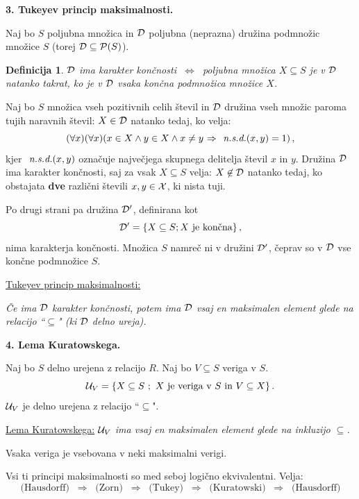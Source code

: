 \documentclass[11pt,paper=b5,DIV=13,headinclude,footinclude]{scrbook}
\newcounter{example}
\def\sledi {{~\Rightarrow~}}
\def\cee {{~\Leftrightarrow~}}
\newtheorem*{definicija}{Definicija}
\begin{document}
\bigskip
\bigskip
\textbf{3. Tukeyev princip maksimalnosti.}

Naj bo $S$ poljubna množica in ${\cal D}$ poljubna (neprazna) družina podmnožic množice $S$ (torej ${\cal D}\subseteq {\cal P}(S)$).

\begin{definicija}
${\cal D}$  ima {\em karakter končnosti} $\cee$ poljubna množica $X\subseteq S$ je v ${\cal D}$ natanko takrat, ko je v ${\cal D}$ vsaka {\em končna} podmnožica množice $X$.
\end{definicija}

\medskip
\begin{example*}
Naj bo $S$ množica vseh pozitivnih celih števil in ${\cal D}$ družina vseh množic paroma tujih naravnih števil:
$X\in {\cal D}$ natanko tedaj, ko velja:
$$(\forall x)(\forall x)(x\in X \land y\in X\land x\neq y\sledi \emph{ n.s.d.}(x,y) = 1)\,,$$
kjer $\emph{ n.s.d.}(x,y)$ označuje največjega skupnega delitelja števil $x$ in $y$.
Družina ${\cal D}$ ima karakter končnosti, saj za vsak $X\subseteq S$ velja:
$X\not\in {\cal D}$ natanko tedaj, ko obstajata \textbf{dve} različni števili $x,y\in {\cal X}$,  ki nista tuji.

Po drugi strani pa družina ${\cal D}'$, definirana kot
$${\cal D}' = \{X\subseteq S; X \textrm{ je končna}\}\,,$$
nima karakterja končnosti. Množica $S$ namreč ni v družini ${\cal D}'$,
čeprav so v ${\cal D}$ vse končne podmnožice $S$.\end{example*}

\bigskip
\underline{Tukeyev princip maksimalnosti:}

{\em Če ima ${\cal D}$ karakter končnosti, potem ima ${\cal D}$ vsaj en maksimalen element glede na relacijo ``$\subseteq$" (ki ${\cal D}$ delno ureja).}

\bigskip

\textbf{4. Lema Kuratowskega.}

Naj bo $S$ delno urejena z relacijo $R$. Naj bo $V\subseteq S$ veriga v $S$.
$${\cal U}_V = \{X\subseteq S~;~X\textrm{ je veriga v }S \textrm{ in } V\subseteq X\}\,.$$
${\cal U}_V$ je delno urejena z relacijo ``$\subseteq$".

\underline{Lema Kuratowskega:}
{\em ${\cal U}_V$ ima vsaj en maksimalen element glede na inkluzijo $\subseteq$.}

\medskip
Vsaka veriga je vsebovana v neki maksimalni verigi.


\bigskip

Vsi ti principi maksimalnosti so med seboj logično ekvivalentni.
Velja:
$$\textrm{(Hausdorff) $\sledi$ (Zorn) $\sledi$ (Tukey) $\sledi$ (Kuratowski) $\sledi$ (Hausdorff)}$$
\end{document}
